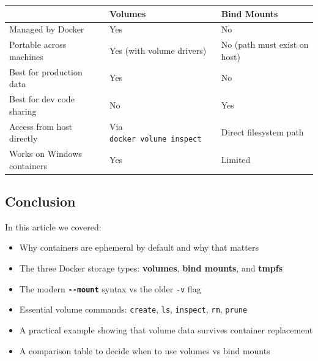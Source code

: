 \documentclass[11pt,american,a4paper,openany]{book}
\providecommand{\tightlist}{%
  \setlength{\itemsep}{2pt}\setlength{\parskip}{0pt}}
\begin{document}
\begin{longtable}[]{@{}
  >{\raggedright\arraybackslash}p{}
  >{\raggedright\arraybackslash}p{}
  >{\raggedright\arraybackslash}p{}@{}}
\toprule\noalign{}
\begin{minipage}[b]{\linewidth}\raggedright
\end{minipage} & \begin{minipage}[b]{\linewidth}\raggedright
Volumes
\end{minipage} & \begin{minipage}[b]{\linewidth}\raggedright
Bind Mounts
\end{minipage} \\
\midrule\noalign{}
\endhead
\bottomrule\noalign{}
\endlastfoot
Managed by Docker & Yes & No \\
Portable across machines & Yes (with volume drivers) & No (path must
exist on host) \\
Best for production data & Yes & No \\
Best for dev code sharing & No & Yes \\
Access from host directly & Via \texttt{docker\ volume\ inspect} &
Direct filesystem path \\
Works on Windows containers & Yes & Limited \\
\end{longtable}

\subsection{Conclusion}\label{conclusion-4}

In this article we covered:

\begin{itemize}
\tightlist
\item
  Why containers are ephemeral by default and why that matters
\item
  The three Docker storage types: \textbf{volumes}, \textbf{bind
  mounts}, and \textbf{tmpfs}
\item
  The modern \textbf{\texttt{-\/-mount}} syntax vs the older \texttt{-v}
  flag
\item
  Essential volume commands: \texttt{create}, \texttt{ls},
  \texttt{inspect}, \texttt{rm}, \texttt{prune}
\item
  A practical example showing that volume data survives container
  replacement
\item
  A comparison table to decide when to use volumes vs bind mounts
\end{itemize}
\end{document}
